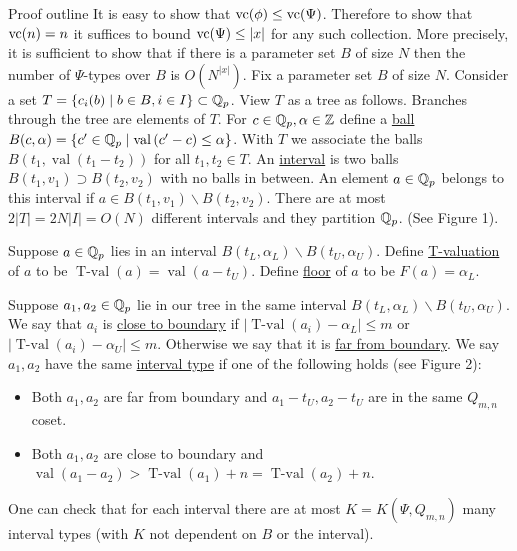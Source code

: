 \documentclass[final]{beamer}
\newcommand{\curly}[1]{\left\{ #1 \right\}}
\newcommand{\paren}[1]{\left( #1 \right)}
\newcommand{\defn}{\underline}
\DeclareMathOperator{\vval}{val}
\DeclareMathOperator{\tval}{T-val}
\newlength{\onecolwid}
\begin{document}
\begin{frame}[t]
\begin{columns}[t]
\begin{column}{\onecolwid}
\begin{block}{Proof outline}
        It is easy to show that $\operatorname{vc}(\phi) \leq \operatorname{vc}(\Psi)$.
        Therefore to show that $\operatorname{vc}(n) = n$ it suffices to bound $\operatorname{vc}(\Psi) \leq |x|$ for any such collection.
        More precisely, it is sufficient to show that if there is a parameter set $B$ of size $N$
        then the number of $\Psi$-types over $B$ is $O(N^{|x|})$.
                Fix a parameter set $B$ of size $N$.
                Consider a set $T = \curly{c_i(b) \mid b \in B, i \in I} \subset \Q_p$.
                View $T$ as a tree as follows.
                Branches through the tree are elements of $T$.
        For $c \in \mathbb{Q}_p, \alpha \in \mathbb{Z}$  define a \defn{ball} 
                        $B(c, \alpha) = \curly{c' \in \Q_p \mid \vval \paren{c' - c} \leq \alpha}$.
                With $T$ we associate the balls $B(t_1, \vval(t_1 - t_2))$ for all $t_1, t_2 \in T$.
                An \defn{interval} is two balls $B(t_1, v_1) \supset B(t_2, v_2)$ with no balls in between.
                An element $a \in \mathbb{Q}_p$ belongs to this interval if $a \in B(t_1, v_1) \backslash B(t_2, v_2)$.
                There are at most $2|T| = 2 N |I| = O(N)$ different intervals and they partition $\mathbb{Q}_p$.
                (See Figure 1).

                Suppose $a \in \mathbb{Q}_p$ lies in an interval $B(t_L, \alpha_L) \backslash B(t_U, \alpha_U)$.
                Define \defn{T-valuation} of $a$ to be $\tval(a) = \vval(a - t_U)$.    
                Define \defn{floor} of $a$ to be $F(a) = \alpha_L$.

            Suppose $a_1, a_2 \in \mathbb{Q}_p$ lie in our tree in the same interval $B(t_L, \alpha_L) \backslash B(t_U, \alpha_U)$.
            We say that $a_i$ is \defn{close to boundary} if $|\tval(a_i) - \alpha_L| \leq m$ or $|\tval(a_i) - \alpha_U| \leq m$.
            Otherwise we say that it is \defn{far from boundary}.
            We say $a_1, a_2$ have the same \defn{interval type} if one of the following holds (see Figure 2):
            \begin{itemize}
                \item Both $a_1, a_2$ are far from boundary and $a_1 - t_U, a_2 - t_U$ are in the same $Q_{m,n}$ coset.
                \item Both $a_1, a_2$ are close to boundary and $\vval(a_1 - a_2) > \tval(a_1) + n = \tval(a_2) + n$.
            \end{itemize}      

        One can check that for each interval there are at most $K = K(\Psi, Q_{m,n})$ many interval types (with $K$ not dependent on $B$ or the interval).


\end{block}
\end{column}
\end{columns}
\end{frame}
\end{document}
